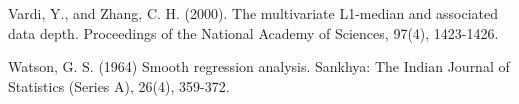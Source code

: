 \documentclass[11pt]{article}
\begin{document}
\begin{flushleft}
Vardi, Y., and Zhang, C. H. (2000). The multivariate L1-median and associated data depth. Proceedings of the National Academy of Sciences, 97(4), 1423-1426.
\vspace{0.05in}

Watson, G. S. (1964) Smooth regression analysis. Sankhya: The Indian Journal of Statistics (Series A), 26(4), 359-372.














\end{flushleft}
\end{document}
